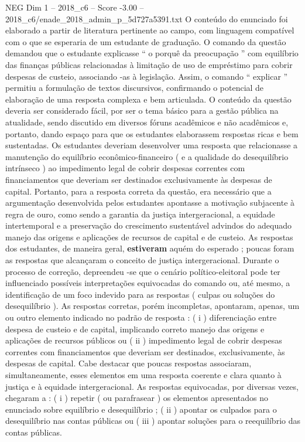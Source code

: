 \begin{textsample}{NEG Dim 1 – 2018\_c6 – Score -3.00 – 2018\_c6/enade\_2018\_admin\_p\_5d727a5391.txt}
O conteúdo do enunciado foi elaborado a partir de literatura pertinente ao campo, com linguagem compatível com o que se esperaria de um estudante de graduação.
O comando da questão demandou que o estudante explicasse “ o porquê da preocupação ” com equilíbrio das finanças públicas relacionadas à limitação de uso de empréstimo para cobrir despesas de custeio, associando -as à legislação.
Assim, o comando “ explicar ” permitiu a formulação de textos discursivos, confirmando o potencial de elaboração de uma resposta complexa e bem articulada.
O conteúdo da questão deveria ser considerado fácil, por ser o tema básico para a gestão pública na atualidade, sendo discutido em diversos fóruns acadêmicos e não acadêmicos e, portanto, dando espaço para que os estudantes elaborassem respostas ricas e bem sustentadas.
Os estudantes deveriam desenvolver uma resposta que relacionasse a manutenção do equilíbrio econômico-financeiro ( e a qualidade do desequilíbrio intrínseco ) ao impedimento legal de cobrir despesas correntes com financiamentos que deveriam ser destinados exclusivamente às despesas de capital.
Portanto, para a resposta correta da questão, era necessário que a argumentação desenvolvida pelos estudantes apontasse a motivação subjacente à regra de ouro, como sendo a garantia da justiça intergeracional, a equidade intertemporal e a preservação do crescimento sustentável advindos do adequado manejo das origens e aplicações de recursos de capital e de custeio.
As respostas dos estudantes, de maneira geral, \textbf{estiveram} aquém do esperado ; poucas foram as respostas que alcançaram o conceito de justiça intergeracional.
Durante o processo de correção, depreendeu -se que o cenário político-eleitoral pode ter influenciado possíveis interpretações equivocadas do comando ou, até mesmo, a identificação de um foco indevido para as respostas ( culpas ou soluções do desequilíbrio ).
As respostas corretas, porém incompletas, apontaram, apenas, um ou outro elemento indicado no padrão de resposta : ( i ) diferenciação entre despesa de custeio e de capital, implicando correto manejo das origens e aplicações de recursos públicos ou ( ii ) impedimento legal de cobrir despesas correntes com financiamentos que deveriam ser destinados, exclusivamente, às despesas de capital.
Cabe destacar que poucas respostas associaram, simultaneamente, esses elementos em uma resposta coerente e clara quanto à justiça e à equidade intergeracional.
As respostas equivocadas, por diversas vezes, chegaram a : ( i ) repetir ( ou parafrasear ) os elementos apresentados no enunciado sobre equilíbrio e desequilíbrio ; ( ii ) apontar os culpados para o desequilíbrio nas contas públicas ou ( iii ) apontar soluções para o reequilíbrio das contas públicas.

\end{textsample}
